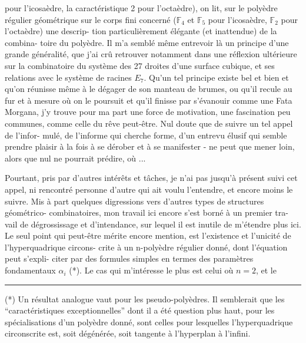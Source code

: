 
pour l'icosaèdre, la caractéristique 2 pour l'octaèdre), on lit,
sur le polyèdre régulier géométrique sur le corps fini concerné
($\mathbb{F}_4$ et $\mathbb{F}_5$ pour l'icosaèdre, $\mathbb{F}_2$ pour l'octaèdre) une descrip-%
tion particulièrement élégante (et inattendue) de la combina-%
toire du polyèdre. Il m'a semblé même entrevoir là un principe
d'une grande généralité, que j'ai crû retrouver notamment dans
une réflexion ultérieure sur la combinatoire du système des 27
droites d'une surface cubique, et ses relations avec le système
de racines $E_7$. Qu'un tel principe existe bel et bien et qu'on
réunisse même à le dégager de son manteau de brumes, ou qu'il
recule au fur et à mesure où on le poursuit et qu'il finisse par
s'évanouir comme une Fata Morgana, j'y trouve pour ma part une
force de motivation, une fascination peu communes, comme celle du
rêve peut-être. Nul doute que de suivre un tel appel de l'infor-%
mulé, de l'informe qui cherche forme, d'un entrevu
élusif qui semble prendre plaisir à la fois à se dérober et à se
manifester - ne peut que mener loin, alors que nul ne pourrait
prédire, où ...

Pourtant, pris par d'autres intérêts et tâches, je n'ai
pas jusqu'à présent suivi cet appel, ni rencontré personne d'autre
qui ait voulu l'entendre, et encore moins le suivre. Mis à part
quelques digressions vers d'autres types de structures géométrico-
combinatoires, mon travail ici encore s'est borné à un premier tra-%
vail de dégrossissage et d'intendance, sur lequel il est inutile
de m'étendre plus ici. Le seul point qui peut-être mérite encore
mention, est l'existence et l'unicité de l'hyperquadrique circons-%
crite à un n-polyèdre régulier donné, dont l'équation peut s'expli-%
citer par des formules simples en termes des paramètres fondamentaux
$\alpha_i$ (*). Le cas qui m'intéresse le plus est celui où $n = 2$, et le

\rule{5cm}{0.4pt}

(*) Un résultat analogue vaut pour les pseudo-polyèdres. Il semblerait
que les ``caractéristiques exceptionnelles'' dont il a été question plus
haut, pour les spécialisations d'un polyèdre donné, sont celles pour
 lesquelles l'hyperquadrique circonscrite est, soit dégénérée, soit
tangente à l'hyperplan à l'infini.


